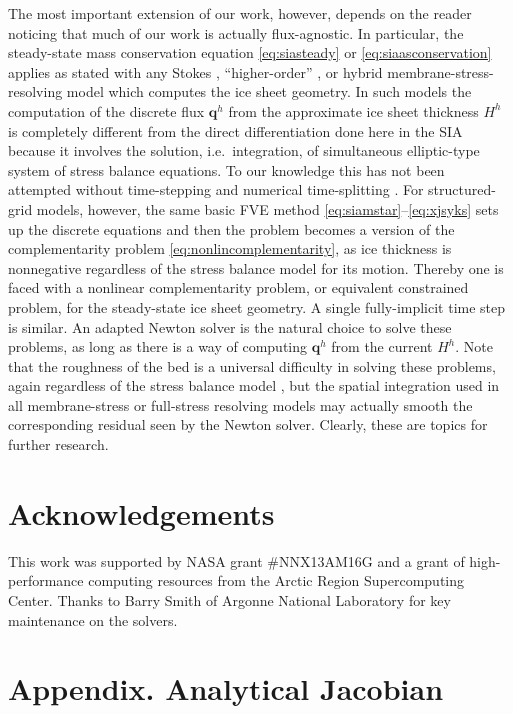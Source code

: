 \documentclass[twocolumn,a4paper]{igs}
\newcommand\bq{\mathbf{q}}
\begin{document}
The most important extension of our work, however, depends on the reader noticing that much of our work is actually flux-agnostic.  In particular, the steady-state mass conservation equation \eqref{eq:siasteady} or \eqref{eq:siaasconservation} applies as stated with any Stokes \citep{GreveBlatter2009}, ``higher-order'' \citep{Pattynetal2008}, or hybrid membrane-stress-resolving \citep{Winkelmannetal2011} model which computes the ice sheet geometry.  In such models the computation of the discrete flux $\bq^h$ from the approximate ice sheet thickness $H^h$ is completely different from the direct differentiation done here in the SIA because it involves the solution, i.e.~integration, of simultaneous elliptic-type system of stress balance equations.  To our knowledge this has not been attempted without time-stepping and numerical time-splitting \citep[for example]{JouvetGraeser2013}.  For structured-grid models, however, the same basic FVE method \eqref{eq:siamstar}--\eqref{eq:xjsyks} sets up the discrete equations and then the problem becomes a version of the complementarity problem \eqref{eq:nonlincomplementarity}, as ice thickness is nonnegative regardless of the stress balance model for its motion.  Thereby one is faced with a nonlinear complementarity problem, or equivalent constrained problem, for the steady-state ice sheet geometry.  A single fully-implicit time step is similar.  An adapted Newton solver is the natural choice to solve these problems, as long as there is a way of computing $\bq^h$ from the current $H^h$.  Note that the roughness of the bed is a universal difficulty in solving these problems, again regardless of the stress balance model \citep[compare][]{BrownSmithAhmadia2013}, but the spatial integration used in all membrane-stress or full-stress resolving models may actually smooth the corresponding residual seen by the Newton solver.  Clearly, these are topics for further research.


\section*{Acknowledgements}
This work was supported by NASA grant \#NNX13AM16G and a grant of high-performance computing resources from the Arctic Region Supercomputing Center.  Thanks to Barry Smith of Argonne National Laboratory for key maintenance on the solvers.





\appendix
\section{Appendix. Analytical Jacobian}
\end{document}
